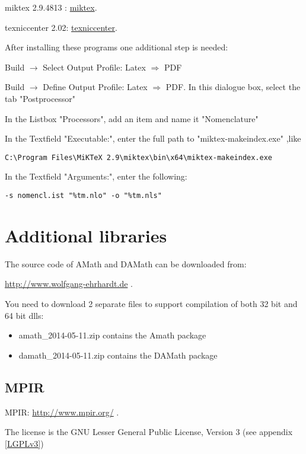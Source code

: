 miktex 2.9.4813 : \href{http://miktex.org/}{miktex}.

texniccenter 2.02: \href{http://www.texniccenter.org/}{texniccenter}.

After installing these programs one additional step is needed: 

Build $\rightarrow$ Select Output Profile: Latex $\Rightarrow$ PDF

Build $\rightarrow$ Define Output Profile: Latex $\Rightarrow$ PDF. In this dialogue box, select the tab "Postprocessor"

In the Listbox "Processors", add an item and name it "Nomenclature"

In the Textfield "Executable:", enter the full path to "miktex-makeindex.exe" ,like 
\begin{verbatim}
C:\Program Files\MiKTeX 2.9\miktex\bin\x64\miktex-makeindex.exe
\end{verbatim}
In the Textfield "Arguments:", enter the following:
\begin{verbatim}
-s nomencl.ist "%tm.nlo" -o "%tm.nls"
\end{verbatim}




\newpage
\section{Additional libraries}


\vpara
The source code of AMath and DAMath can be downloaded from:

\vpara
\href{http://www.wolfgang-ehrhardt.de}{http://www.wolfgang-ehrhardt.de} . 

You need to download 2 separate files to support compilation of both 32 bit and 64 bit dlls:

\begin{itemize}
	\item amath\_2014-05-11.zip contains the Amath package
	\item damath\_2014-05-11.zip contains the DAMath package
\end{itemize}




\subsection{MPIR}
MPIR: \href{http://www.mpir.org/}{http://www.mpir.org/} . 

The license is the GNU Lesser General Public License, Version 3 (see appendix \ref{LGPLv3})

